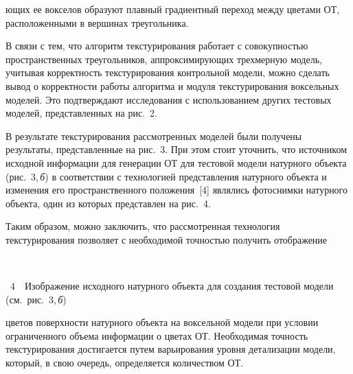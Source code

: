 \begin{multicols}{2}


\noindent
ющих ее вокселов образуют плавный градиентный
переход между цветами ОТ, расположенными в вершинах
треугольника.

  В связи с тем, что алгоритм текстурирования работает с совокупностью
пространственных треугольников, аппроксимирующих трехмерную \mbox{модель},
учитывая корректность текстурирования контрольной модели, можно
сделать вывод о корректности работы алгоритма и модуля текстурирования
воксельных моделей. Это подтверждают исследования с использованием
других тестовых моделей, представленных на рис.~2.



  В результате текстурирования рассмотренных моделей были получены
результаты, представленные на рис.~3.
  При этом стоит уточнить, что источником исходной информации для
генерации ОТ для тестовой модели натурного объекта (рис.~3,\,\textit{б}) в
соответствии с технологией представления натурного объекта и изменения
его пространственного положения~[4] являлись фотоснимки натурного
объекта, один из которых представлен на рис.~4.

	Таким образом, можно заключить, что рассмотренная технология
текстурирования позволяет с  необходимой точностью получить отображение\linebreak

\noindent
\begin{center}  %
\mbox{%
\epsfxsize=78mm
}
  \end{center}


\noindent
{{\figurename~4}\ \ \small{Изображение исходного натурного объекта для создания тестовой модели
(см.\ рис.~3,\,\textit{б})}}


\vspace*{8pt}



\noindent
цветов поверхности натурного объекта на воксельной модели при условии
ограниченного объема информации о цветах ОТ. Необходимая точность
текстурирования достигается путем варьирования уровня детализации
модели, который, в свою очередь, определяется количеством ОТ.


\end{multicols}
